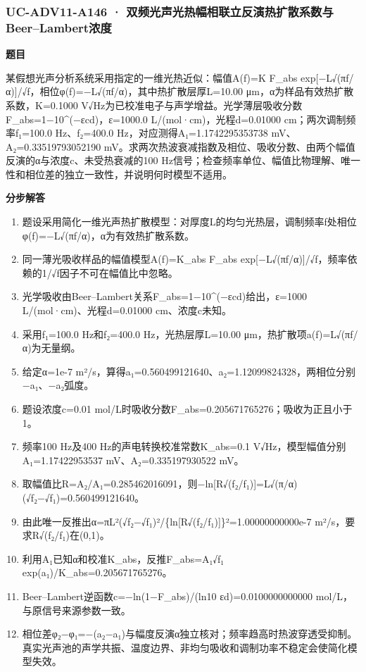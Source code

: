 \documentclass[UTF8,11pt,a4paper]{ctexart}
\begin{document}
\subsubsection*{UC-ADV11-A146 · 双频光声光热幅相联立反演热扩散系数与Beer–Lambert浓度}
\noindent\textbf{题目}\par
某假想光声分析系统采用指定的一维光热近似：幅值A(f)=K F\_abs exp[−L√(πf/α)]/√f，相位φ(f)=−L√(πf/α)，其中热扩散层厚L=10.00 μm，α为样品有效热扩散系数，K=0.1000 V√Hz为已校准电子与声学增益。光学薄层吸收分数F\_abs=1−10\textasciicircum{}(−εcd)，ε=1000.0 L/(mol·cm)，光程d=0.01000 cm；两次调制频率f₁=100.0 Hz、f₂=400.0 Hz，对应测得A₁=1.1742295353738 mV、A₂=0.33519793052190 mV。求两次热波衰减指数及相位、吸收分数、由两个幅值反演的α与浓度c、未受热衰减的100 Hz信号；检查频率单位、幅值比物理解、唯一性和相位差的独立一致性，并说明何时模型不适用。\par
\medskip\noindent\textbf{分步解答}
\begin{enumerate}
\item 题设采用简化一维光声热扩散模型：对厚度L的均匀光热层，调制频率f处相位φ(f)=−L√(πf/α)，α为有效热扩散系数。
\item 同一薄光吸收样品的幅值模型A(f)=K\_abs F\_abs exp[−L√(πf/α)]/√f，频率依赖的1/√f因子不可在幅值比中忽略。
\item 光学吸收由Beer–Lambert关系F\_abs=1−10\textasciicircum{}(−εcd)给出，ε=1000 L/(mol·cm)、光程d=0.01000 cm、浓度c未知。
\item 采用f₁=100.0 Hz和f₂=400.0 Hz，光热层厚L=10.00 μm，热扩散项a(f)=L√(πf/α)为无量纲。
\item 给定α=1e-7 m²/s，算得a₁=0.560499121640、a₂=1.12099824328，两相位分别−a₁、−a₂弧度。
\item 题设浓度c=0.01 mol/L时吸收分数F\_abs=0.205671765276；吸收为正且小于1。
\item 频率100 Hz及400 Hz的声电转换校准常数K\_abs=0.1 V√Hz，模型幅值分别A₁=1.17422953537 mV、A₂=0.335197930522 mV。
\item 取幅值比R=A₂/A₁=0.285462016091，则−ln[R√(f₂/f₁)]=L√(π/α)(√f₂−√f₁)=0.560499121640。
\item 由此唯一反推出α=πL²(√f₂−√f₁)²/\{ln[R√(f₂/f₁)]\}²=1.00000000000e-7 m²/s，要求R√(f₂/f₁)在(0,1)。
\item 利用A₁已知α和校准K\_abs，反推F\_abs=A₁√f₁ exp(a₁)/K\_abs=0.205671765276。
\item Beer–Lambert逆函数c=−ln(1−F\_abs)/(ln10 εd)=0.0100000000000 mol/L，与原信号来源参数一致。
\item 相位差φ₂−φ₁=−(a₂−a₁)与幅度反演α独立核对；频率趋高时热波穿透受抑制。真实光声池的声学共振、温度边界、非均匀吸收和调制功率不稳定会使简化模型失效。
\end{enumerate}
\end{document}
